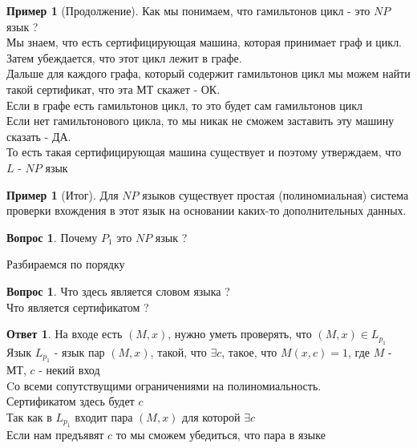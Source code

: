 \documentclass{beamer}
\theoremstyle{plain}
\theoremstyle{definition}
\newtheorem{Q}[thm]{Вопрос}
\newtheorem{A}[thm]{Ответ}
\newtheorem{ex}[thm]{Пример}
\begin{document}
\begin{frame}
	\begin{ex}[Продолжение]
	    Как мы понимаем, что гамильтонов цикл - это $NP$ язык ? \\
	    Мы знаем, что есть сертифицирующая машина, которая принимает граф и цикл. Затем убеждается, что этот цикл лежит в графе. \\
	    Дальше для каждого графа, который содержит гамильтонов цикл мы можем найти такой сертификат, что эта МТ скажет - ОК. \\
	    Если в графе есть гамильтонов цикл, то это будет сам гамильтонов цикл \\
	    Если нет гамильтонового цикла, то мы никак не сможем заставить эту машину сказать - ДА. \\
	    То есть такая сертифицирующая машина существует и поэтому утверждаем, что $L$ - $NP$ язык 
	\end{ex}
\end{frame}

\begin{frame}
	\begin{ex}[Итог]
	    Для $NP$ языков существует простая (полиномиальная) система проверки вхождения в этот язык на основании каких-то дополнительных данных.
	\end{ex}
\end{frame}

\begin{frame}
	\begin{Q}
	    Почему $P_1$ это $NP$ язык ?
	\end{Q}
\end{frame}

\begin{frame}
    Разбираемся по порядку
	\begin{Q}
	    Что здесь является словом языка ? \\
	    Что является сертификатом ?	
	\end{Q}

	\begin{A}
	    На входе есть $(M,x)$, нужно уметь проверять, что $(M,x)\in L_p_1$ \\
	    Язык $L_{p_1}$ - язык пар $(M,x)$, такой, что $\exists c$, такое, что $M(x,c)=1$, где $M$ - МТ, $c$ - некий вход \\
	    Cо всеми сопутствущими ограничениями на полиномиальность. \\
	    Сертификатом здесь будет $c$ \\
	    Так как в $L_{p_1}$ входит пара $(M,x)$ для которой $\exists c$ \\ Если нам предъявят $c$ то мы сможем убедиться, что пара в языке
	\end{A}
\end{frame}
\end{document}

